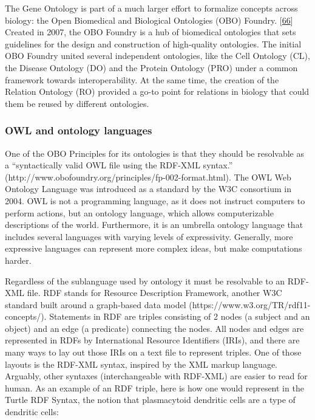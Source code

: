 The Gene Ontology is part of a much larger effort to formalize concepts across biology: the Open Biomedical and Biological Ontologies (OBO) Foundry. {[}\protect\hyperlink{ref-j3tJyG7J}{66}{]}
Created in 2007, the OBO Foundry is a hub of biomedical ontologies that sets guidelines for the design and construction of high-quality ontologies.
The initial OBO Foundry united several independent ontologies, like the Cell Ontology (CL), the Disease Ontology (DO) and the Protein Ontology (PRO) under a common framework towards interoperability.
At the same time, the creation of the Relation Ontology (RO) provided a go-to point for relations in biology that could them be reused by different ontologies.

\hypertarget{owl-and-ontology-languages}{%
\subsubsection{OWL and ontology languages}\label{owl-and-ontology-languages}}

One of the OBO Principles for its ontologies is that they should be resolvable as a ``syntactically valid OWL file using the RDF-XML syntax.'' (http://www.obofoundry.org/principles/fp-002-format.html).
The OWL Web Ontology Language was introduced as a standard by the W3C consortium in 2004.
OWL is not a programming language, as it does not instruct computers to perform actions, but an ontology language, which allows computerizable descriptions of the world.
Furthermore, it is an umbrella ontology language that includes several languages with varying levels of expressivity.
Generally, more expressive languages can represent more complex ideas, but make computations harder.

Regardless of the sublanguage used by ontology it must be resolvable to an RDF-XML file. RDF stands for Resource Description Framework, another W3C standard built around a graph-based data model (https://www.w3.org/TR/rdf11-concepts/).
Statements in RDF are triples consisting of 2 nodes (a subject and an object) and an edge (a predicate) connecting the nodes.
All nodes and edges are represented in RDFs by International Resource Identifiers (IRIs), and there are many ways to lay out those IRIs on a text file to represent triples.
One of those layouts is the RDF-XML syntax, inspired by the XML markup language.
Arguably, other syntaxes (interchangeable with RDF-XML) are easier to read for human.
As an example of an RDF triple, here is how one would represent in the Turtle RDF Syntax, the notion that plasmacytoid dendritic cells are a type of dendritic cells:


